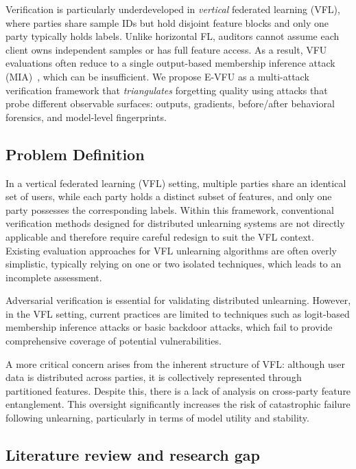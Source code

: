 \documentclass[sigconf,nonacm]{acmart}
\begin{document}
Verification is particularly underdeveloped in \emph{vertical} federated learning (VFL), where parties share sample IDs but hold disjoint feature blocks and only one party typically holds labels. Unlike horizontal FL, auditors cannot assume each client owns independent samples or has full feature access. As a result, VFU evaluations often reduce to a single output-based membership inference attack (MIA)~\cite{varshney2025vfu}, which can be insufficient. We propose E-VFU as a multi-attack verification framework that \emph{triangulates} forgetting quality using attacks that probe different observable surfaces: outputs, gradients, before/after behavioral forensics, and model-level fingerprints.

\subsection{Problem Definition}

In a vertical federated learning (VFL) setting, multiple parties share an identical set of users, while each party holds a distinct subset of features, and only one party possesses the corresponding labels. Within this framework, conventional verification methods designed for distributed unlearning systems are not directly applicable and therefore require careful redesign to suit the VFL context. Existing evaluation approaches for VFL unlearning algorithms are often overly simplistic, typically relying on one or two isolated techniques, which leads to an incomplete assessment.

Adversarial verification is essential for validating distributed unlearning. However, in the VFL setting, current practices are limited to techniques such as logit-based membership inference attacks\cite{varshney2025vfu} or basic backdoor attacks\cite{yang2019federated}, which fail to provide comprehensive coverage of potential vulnerabilities.

A more critical concern arises from the inherent structure of VFL: although user data is distributed across parties, it is collectively represented through partitioned features. Despite this, there is a lack of analysis on cross-party feature entanglement. This oversight significantly increases the risk of catastrophic failure following unlearning, particularly in terms of model utility and stability.




\subsection{Literature review and research gap}
\end{document}
